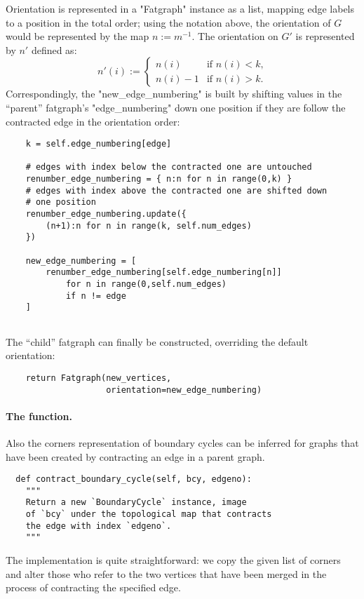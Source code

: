 Orientation is represented in a "Fatgraph" instance as a list, mapping
edge labels to a position in the total order; using the notation
above, the orientation of $G$ would be represented by the map
$n := m^{-1}$.  The orientation on $G'$ is represented by $n'$ defined
as:
\begin{equation*}
  n'(i) :=
  \begin{cases}
    n(i)    &\text{if $n(i)<k$,} 
    \\
    n(i)-1  &\text{if $n(i)>k$.}
  \end{cases}
\end{equation*}
Correspondingly, the "new_edge_numbering" is built by shifting values
in the ``parent'' fatgraph's "edge_numbering" down one position if
they are follow the contracted edge in the orientation order:
\begin{lstlisting}
    k = self.edge_numbering[edge]

    # edges with index below the contracted one are untouched
    renumber_edge_numbering = { n:n for n in range(0,k) }
    # edges with index above the contracted one are shifted down
    # one position
    renumber_edge_numbering.update({ 
        (n+1):n for n in range(k, self.num_edges) 
    })

    new_edge_numbering = [ 
        renumber_edge_numbering[self.edge_numbering[n]]
            for n in range(0,self.num_edges)
            if n != edge 
    ]
    
\end{lstlisting}

The ``child'' fatgraph can finally be constructed, overriding the
default orientation:
\begin{lstlisting}
    return Fatgraph(new_vertices, 
                    orientation=new_edge_numbering)

\end{lstlisting}

\paragraph{The  function.}
Also the corners representation of boundary cycles can be inferred for
graphs that have been created by contracting an edge in a parent
graph.
\begin{lstlisting}
  def contract_boundary_cycle(self, bcy, edgeno):
    """
    Return a new `BoundaryCycle` instance, image 
    of `bcy` under the topological map that contracts 
    the edge with index `edgeno`.
    """
\end{lstlisting}
The implementation is quite straightforward: we copy the given list of
corners and alter those who refer to the two vertices that have been
merged in the process of contracting the specified edge.

